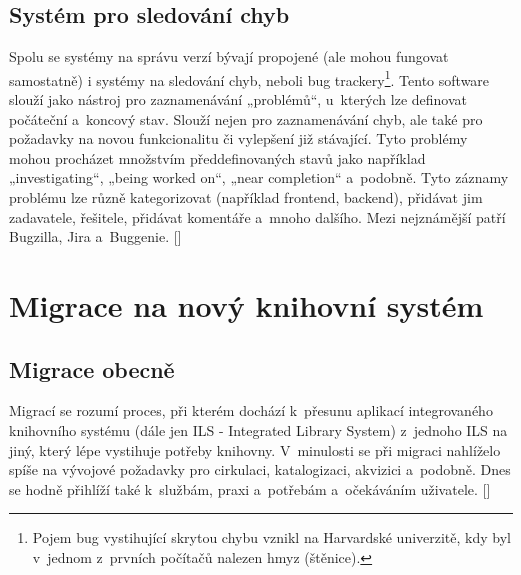 \documentclass[
	11pt, oneside, printed, final, palatino, monochrome
	microtype,
	table,   %
	lof,     %
	lot     %
]{fithesis3}
\newcommand{\citepages}[2]{[\cite[#1]{#2}]}
\begin{document}
{\subsection{Systém pro sledování chyb}
Spolu se systémy na správu verzí bývají propojené (ale mohou fungovat samostatně) i systémy na sledování chyb, neboli bug trackery\footnote{Pojem bug vystihující skrytou chybu vznikl na Harvardské univerzitě, kdy byl v~jednom z~prvních počítačů nalezen hmyz (štěnice).}. Tento software slouží jako nástroj pro zaznamenávání „problémů“, u~kterých lze definovat počáteční a~koncový stav. Slouží nejen pro zaznamenávání chyb, ale také pro požadavky na novou funkcionalitu či vylepšení již stávající. Tyto problémy mohou procházet množstvím předdefinovaných stavů jako například „investigating“, „being worked on“, „near completion“ a~podobně. Tyto záznamy problému lze různě kategorizovat (například frontend, backend), přidávat jim zadavatele, řešitele, přidávat komentáře a~mnoho dalšího. Mezi nejznámější patří Bugzilla, Jira a~Buggenie. \citepages{99-104}{Fogel2012}

\section{Migrace na nový knihovní systém}

\subsection{Migrace obecně}

Migrací se rozumí proces, při kterém dochází k~přesunu aplikací integrovaného knihovního systému (dále jen ILS - Integrated Library System) z~jednoho ILS na jiný, který lépe vystihuje potřeby knihovny. V~minulosti se při migraci nahlíželo spíše na vývojové požadavky pro cirkulaci, katalogizaci, akvizici a~podobně. Dnes se hodně přihlíží také k~službám, praxi a~potřebám a~očekáváním uživatele. \citepages{151-152}{bilal_2014}

}
\end{document}
